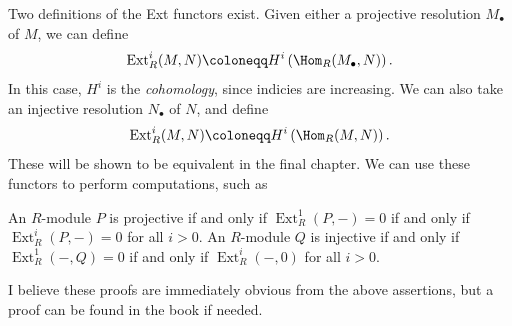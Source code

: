 Two definitions of the Ext functors exist. Given either a projective resolution $M_\bullet $ of $M$, we can define
\[
	\operatorname{Ext}_R^i(M,N)\coloneqq H^i\left( \Hom_{R}(M_\bullet , N)  \right) 
.\]
In this case, $H^i$ is the \emph{cohomology}, since indicies are increasing. We can also take an injective resolution $N_\bullet $ of $N$, and define
\[
	\operatorname{Ext}_R^i(M,N)\coloneqq H^i\left( \Hom_{R}(M, N)  \right) 
.\]
These will be shown to be equivalent in the final chapter. We can use these functors to perform computations, such as
\begin{proposition}\label{prp:8.10}
	An $R$-module $P$ is projective if and only if $\operatorname{Ext}_R^1\left( P,- \right) =0$ if and only if $\operatorname{Ext}_R^i(P,-)=0$ for all $i>0$. An $R$-module $Q$ is injective if and only if $\operatorname{Ext}_R^1(-,Q)=0$ if and only if $\operatorname{Ext}_R^i(-,0)$ for all $i>0$.
\end{proposition}

I believe these proofs are immediately obvious from the above assertions, but a proof can be found in the book if needed.
